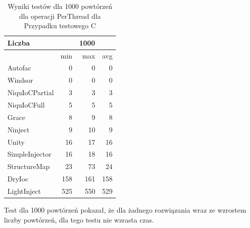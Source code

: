 \documentclass[12pt]{article}
\begin{document}
\begin{table}[H]
\captionsetup{belowskip=0pt,aboveskip=0pt}
\begin{center}
\begin{small}
	\begin{tabular}{ | l | r r r | }
    		\hline
Liczba & & 1000 & \\ \hline
 & min & max & avg \\ \hline
Autofac & 0 & 0 & 0 \\ \hline
Windsor & 0 & 0 & 0 \\ \hline
NiquIoCPartial & 3 & 3 & 3 \\ \hline
NiquIoCFull & 5 & 5 & 5 \\ \hline
Grace & 8 & 9 & 8 \\ \hline
Ninject & 9 & 10 & 9 \\ \hline
Unity & 16 & 17 & 16 \\ \hline
SimpleInjector & 16 & 18 & 16 \\ \hline
StructureMap & 23 & 73 & 24 \\ \hline
DryIoc & 158 & 161 & 158 \\ \hline
LightInject & 525 & 550 & 529 \\ \hline
  	\end{tabular}
\end{small}
\end{center}
\caption{Wyniki testów dla 1000 powtórzeń dla operacji PerThread dla Przypadku testowego C}
\label{TestCaseC_PerThread1000}
\end{table}
Test dla 1000 powtórzeń pokazał, że dla żadnego rozwiązania wraz ze wzrostem liczby powtórzeń, dla tego testu nie wzrasta czas.
\end{document}
